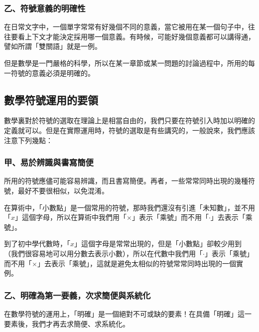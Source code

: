 \subsubsection*{乙、符號意義的明確性}\label{subsec:2-1-b}

在日常文字中，一個單字常常有好幾個不同的意義，當它被用在某一個句子中，往往要看上下文才能決定採用哪一個意義。有時候，可能好幾個意義都可以講得通，譬如所謂「雙關語」就是一例。

但是數學是一門嚴格的科學，所以在某一章節或某一問題的討論過程中，所用的每一符號的意義必須是明確的。

\subsection{數學符號運用的要領}\label{sec:2-2}

數學裏對於符號的選取在理論上是相當自由的，我們只要在符號引入時加以明確的定義就可以。但是在實際運用時，符號的選取是有些講究的，一般說來，我們應該注意下列幾點：

\subsubsection*{甲、易於辨識與書寫簡便}\label{subsec:2-2-a}

所用的符號應儘可能容易辨識，而且書寫簡便。再者，一些常常同時出現的幾種符號，最好不要很相似，以免混淆。

\begin{example}\label{ex:2-2-1}
在算術中，「小數點」是一個常用的符號，那時我們還沒有引進「未知數」，並不用「$x$」這個字母，所以在算術中我們用「$\times$」表示「乘號」而不用「$\cdot$」去表示「乘號」。

到了初中學代數時，「$x$」這個字母是常常出現的，但是「小數點」卻較少用到（我們很容易地可以用分數去表示小數），所以在代數中我們用「$\cdot$」表示「乘號」而不用「$\times$」去表示「乘號」，這就是避免太相似的符號常常同時出現的一個實例。
\end{example}

\subsubsection*{乙、明確為第一要義，次求簡便與系統化}\label{subsec:2-2-b}

在數學符號的運用上，「明確」是一個絕對不可或缺的要素！在具備「明確」這一要素後，我們才再去求簡便、求系統化。

